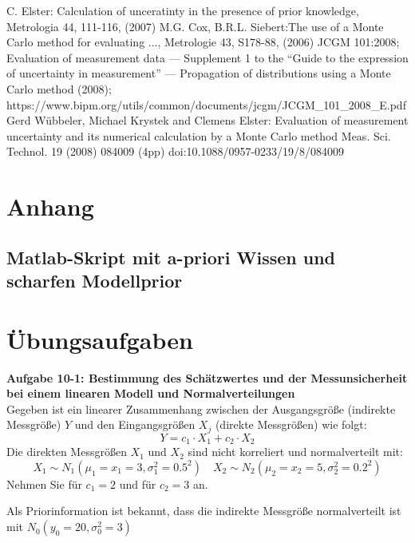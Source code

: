 \begin{thebibliography}{------}
     C. Elster: Calculation of unceratinty
	in the presence of prior knowledge, Metrologia 44, 111-116, (2007)
     M.G. Cox, B.R.L. Siebert:The use of
    a Monte Carlo method for evaluating ..., Metrologie 43, S178-88,
    (2006)
    JCGM 101:2008; Evaluation of measurement data — Supplement 1 to the 
    “Guide to the expression of uncertainty in measurement” — 
    Propagation of distributions using a Monte Carlo method (2008); \newline 
    https://www.bipm.org/utils/common/documents/jcgm/JCGM\_101\_2008\_E.pdf
     Gerd Wübbeler, Michael Krystek and Clemens Elster: Evaluation of measurement uncertainty
    and its numerical calculation by a Monte Carlo method
    Meas. Sci. Technol. 19 (2008) 084009 (4pp)
    doi:10.1088/0957-0233/19/8/084009
    \end{thebibliography}

\newpage
\section*{Anhang}
\subsection*{Matlab-Skript mit a-priori Wissen und scharfen Modellprior}


\newpage
\section*{Übungsaufgaben}
\textbf{Aufgabe 10-1: Bestimmung des Schätzwertes und der Messunsicherheit bei
einem linearen Modell und Normalverteilungen}\\
Gegeben ist ein linearer Zusammenhang zwischen der Ausgangsgröße (indirekte
Messgröße) $Y$ und den Eingangsgrößen $X_j$ (direkte Messgrößen) wie folgt:
\[
Y = c_1 \cdot X_1 + c_2 \cdot X_2
\]
Die direkten Messgrößen $X_1$ und $X_2$ sind nicht korreliert und 
normalverteilt mit: 
\[
X_1 \sim N_{1}(\mu_1 =x_1=3,\sigma_1^2= 0.5^2 ) 
\quad X_2 \sim N_{2}(\mu_2=x_2= 5,\sigma_2^2=0.2^2 )
\]
Nehmen Sie für $c_1 = 2$ und für $c_2 = 3$ an. 

Als Priorinformation ist bekannt, dass die indirekte Messgröße
normalverteilt ist mit \newline  $N_0(y_0=20,\sigma_0^2=3)$

